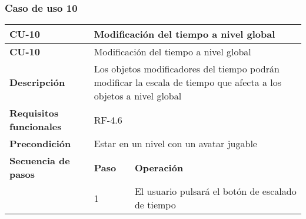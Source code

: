 \subsubsection{Caso de uso 10}
\begin{longtable}{lll}
\textbf{CU-10}                                   & \multicolumn{2}{l}{Modificación del tiempo a nivel global}                                                                                                                                                                                                                       \\ \hline
\endfirsthead
\textbf{CU-10}                                   & \multicolumn{2}{l}{Modificación del tiempo a nivel global}                                                                                                                                                                                                                       \\ \hline
\endhead
%
\textbf{Descripción}                             & \multicolumn{2}{l}{Los objetos modificadores del tiempo podrán modificar la escala de tiempo que afecta a los objetos a nivel global}                                                                                                                                            \\ \hline
\textbf{Requisitos funcionales}                  & \multicolumn{2}{l}{RF-4.6}                                                                                                                                                                                                                                                       \\ \hline
\textbf{Precondición}                            & \multicolumn{2}{l}{Estar en un nivel con un avatar jugable}                                                                                                                                                                                                                      \\ \hline
\multicolumn{1}{l|}{\textbf{Secuencia de pasos}} & \textbf{Paso}                                                                                  & \textbf{Operación}                                                                                                                                                              \\ \cline{2-3} 
\multicolumn{1}{l|}{}                            & 1                                                                                              & El usuario pulsará el botón de escalado de tiempo                                                                                                                               \\

\end{longtable}
